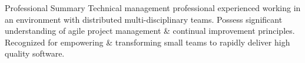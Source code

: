 \documentclass{resume} %
\begin{document}
\vspace{1em}

\begin{rSection}{Professional Summary}
Technical management professional experienced working in an
environment with distributed multi-disciplinary teams. Possess significant
understanding of agile project management \& continual improvement principles. Recognized for
empowering \& transforming small teams to rapidly deliver high
quality software.
\end{rSection}

\end{document}
